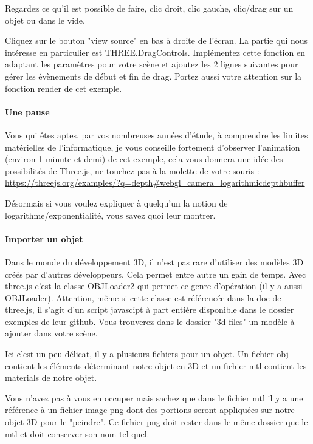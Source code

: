 \documentclass[a4paper,10pt]{article}
\begin{document}
Regardez ce qu'il est possible de faire, clic droit, clic gauche, clic/drag sur un objet ou dans le vide.

Cliquez sur le bouton "view source" en bas à droite de l'écran. La partie qui nous intéresse en particulier est THREE.DragControls.
Implémentez cette fonction en adaptant les paramètres pour votre scène et ajoutez les 2 lignes suivantes pour gérer les évènements de début et fin de drag.
Portez aussi votre attention sur la fonction render de cet exemple.

\paragraph{Une pause}
Vous qui êtes aptes, par vos nombreuses années d'étude, à comprendre les limites matérielles de l'informatique, je vous conseille fortement d'observer l'animation (environ 1 minute et demi) de cet exemple, cela vous donnera une idée des possibilités de Three.js, ne touchez pas à la molette de votre souris : \url{https://threejs.org/examples/?q=depth#webgl_camera_logarithmicdepthbuffer}

Désormais si vous voulez expliquer à quelqu'un la notion de logarithme/exponentialité, vous savez quoi leur montrer.



\paragraph{Importer un objet}
Dans le monde du développement 3D, il n'est pas rare d'utiliser des modèles 3D créés par d'autres développeurs.
Cela permet entre autre un gain de temps.
Avec three.js c'est la classe OBJLoader2 qui permet ce genre d'opération (il y a aussi OBJLoader).
Attention, même si cette classe est référencée dans la doc de three.js, il s'agit d'un script javascipt à part entière disponible dans le dossier exemples de leur github.
Vous trouverez dans le dossier "3d files" un modèle à ajouter dans votre scène.

Ici c'est un peu délicat, il y a plusieurs fichiers pour un objet.
Un fichier obj contient les éléments déterminant notre objet en 3D et un fichier mtl contient les materials de notre objet.

Vous n'avez pas à vous en occuper mais sachez que dans le fichier mtl il y a une référence à un fichier image png dont des portions seront appliquées sur notre objet 3D pour le "peindre".
Ce fichier png doit rester dans le même dossier que le mtl et doit conserver son nom tel quel.\\
\end{document}
